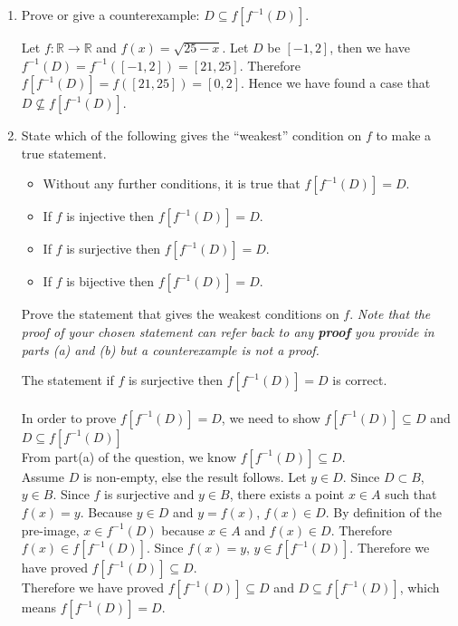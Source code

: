 \documentclass{article}
\begin{document}
\begin{enumerate}
\begin{enumerate}
\item Prove or give a counterexample: $D \subseteq f\left[f^{-1} (D) \right].$
\vspace{.15in}

 Let $f:\mathbb{R} \rightarrow \mathbb{R}$ and $f(x) = \sqrt{25-x}$. Let $D$ be $[-1,2]$, then we have $f^{-1}(D) = f^{-1}([-1,2]) = [21,25]$. Therefore $f[f^{-1}(D)] = f([21,25]) = [0,2]$. Hence we have found a case that $D \nsubseteq f[f^{-1}(D)]$.\\
\item State which of the following gives  the ``weakest'' condition on $f$ to make a
true statement.
\begin{itemize}
\item Without any further conditions, it is true that  $f\left[f^{-1} (D) \right] = D$.
\item If $f$ is injective then $f\left[f^{-1} (D) \right] = D$.
\item If $f$ is surjective then $f\left[f^{-1} (D) \right] = D$.
\item If $f$ is bijective then $f\left[f^{-1} (D) \right] = D$.
\end{itemize}
Prove the statement that gives the weakest conditions on $f$. {\it Note that the proof of your chosen statement can refer back to any {\bf proof} you provide in parts (a) and (b) but a counterexample is not a proof.}
\vspace{.15in}

The statement if $f$ is surjective then $f\left[f^{-1} (D) \right] = D$ is correct. \\\\

 In order to prove $f\left[f^{-1} (D) \right] = D$, we need to show $f\left[f^{-1} (D) \right] \subseteq D$ and $D \subseteq f\left[f^{-1} (D) \right]$\\

From part(a) of the question, we know  $f\left[f^{-1} (D) \right] \subseteq D$.\\

Assume $D$ is non-empty, else the result follows. Let $y \in D$. Since $D \subset B$, $y \in B$. Since $f$ is surjective and $y \in B$, there exists a point $x \in A$ such that $f(x) = y$. Because $y \in D$ and $y = f(x)$, $f(x) \in D$. By definition of the pre-image, $x \in f^{-1}(D)$ because $x \in A$ and $f(x) \in D$. Therefore $f(x) \in f[f^{-1}(D)]$. Since $f(x) = y$, $y \in  f[f^{-1}(D)]$. Therefore we have proved $f\left[f^{-1} (D) \right] \subseteq D$.\\

Therefore we have proved $f\left[f^{-1} (D) \right] \subseteq D$ and $D \subseteq f\left[f^{-1} (D) \right]$, which means  $f\left[f^{-1} (D) \right] = D$.
\end{enumerate}

\end{enumerate}
\end{document}
